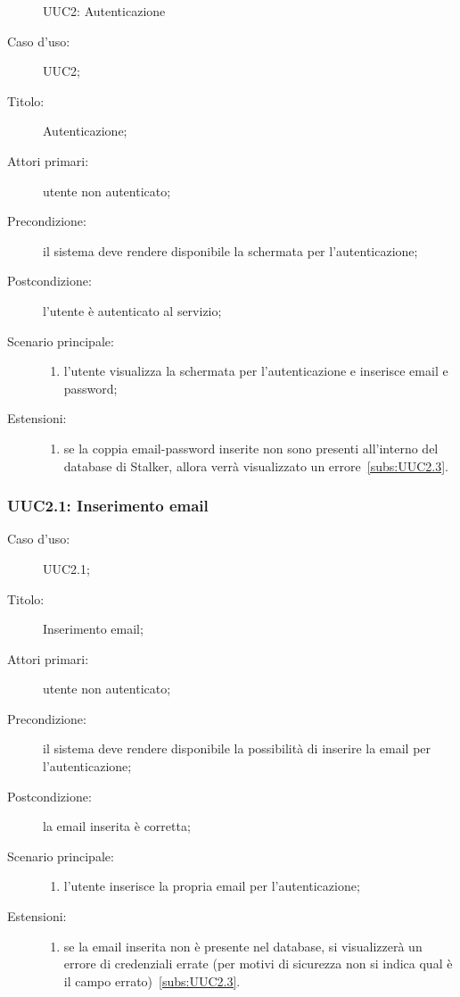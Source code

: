 \documentclass[../../../analisi-dei-requisiti.tex]{subfiles}
\begin{document}
\begin{figure}[H]
  \centering
  \caption{UUC2: Autenticazione}%
  \label{fig:uuc2}
\end{figure}

\begin{description}
  \item[Caso d’uso:] UUC2;
  \item[Titolo:] Autenticazione;
  \item[Attori primari:] utente non autenticato;
  \item[Precondizione:] il sistema deve rendere disponibile la schermata per l'autenticazione;
  \item[Postcondizione:] l'utente è autenticato al servizio;
  \item[Scenario principale:]
  \begin{enumerate}
    \item l'utente visualizza la schermata per l'autenticazione e inserisce email e password;
  \end{enumerate}
  \item[Estensioni:]
  \begin{enumerate}
    \item se la coppia email-password inserite non sono presenti all'interno del database di Stalker, allora verrà visualizzato un errore~\ref{subs:UUC2.3}.
  \end{enumerate}
\end{description}



\subsubsection{UUC2.1: Inserimento email}%
\label{subs:UUC2.1}
\begin{description}
  \item[Caso d’uso:] UUC2.1;
  \item[Titolo:] Inserimento email;
  \item[Attori primari:] utente non autenticato;
  \item[Precondizione:] il sistema deve rendere disponibile la possibilità di inserire la email per l'autenticazione;
  \item[Postcondizione:] la email inserita è corretta;
  \item[Scenario principale:]
  \begin{enumerate}
    \item l'utente inserisce la propria email per l'autenticazione;
  \end{enumerate}
  \item[Estensioni:]
  \begin{enumerate}
    \item se la email inserita non è presente nel database, si visualizzerà un errore di credenziali errate (per motivi di sicurezza non si indica qual è il campo errato)~\ref{subs:UUC2.3}.
  \end{enumerate}
\end{description}
\end{document}
